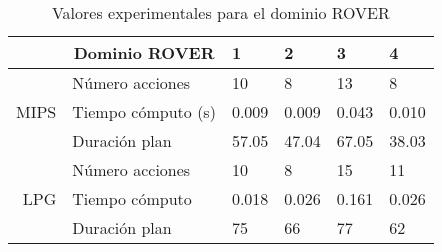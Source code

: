 \documentclass[a4paper]{article}
\begin{document}
\begin{table}[h] \label{frover}
\begin{center}
\begin{tabular}{r|c| l|l|l|l|}
& Dominio ROVER & 1 & 2 & 3 & 4 \\ \hline \hline
\multirow{3}{*}{MIPS} & \multicolumn{1}{l|}{Número acciones} & \multicolumn{1}{l|}{10} & \multicolumn{1}{l|}{8} & \multicolumn{1}{l|}{13} & \multicolumn{1}{l|}{8} \\\cline{2-6}
                     & \multicolumn{1}{l|}{Tiempo cómputo (s)} & \multicolumn{1}{l|}{0.009} & \multicolumn{1}{l|}{0.009} & \multicolumn{1}{l|}{0.043} & \multicolumn{1}{l|}{0.010} \\\cline{2-6}
                     & \multicolumn{1}{l|}{Duración plan} & \multicolumn{1}{l|}{57.05} & \multicolumn{1}{l|}{47.04} & \multicolumn{1}{l|}{67.05} & \multicolumn{1}{l|}{38.03} \\\hline \hline
\multirow{3}{*}{LPG} & \multicolumn{1}{l|}{Número acciones} & \multicolumn{1}{l|}{10} & \multicolumn{1}{l|}{8} & \multicolumn{1}{l|}{15} & \multicolumn{1}{l|}{11} \\\cline{2-6}
                     & \multicolumn{1}{l|}{Tiempo cómputo} & \multicolumn{1}{l|}{0.018} & \multicolumn{1}{l|}{0.026} & \multicolumn{1}{l|}{0.161} & \multicolumn{1}{l|}{0.026} \\\cline{2-6}
                     & \multicolumn{1}{l|}{Duración plan} & \multicolumn{1}{l|}{75} & \multicolumn{1}{l|}{66} & \multicolumn{1}{l|}{77} & \multicolumn{1}{l|}{62} \\\hline
\end{tabular}
\caption{Valores experimentales para el dominio ROVER}
\end{center} \end{table}
\end{document}
